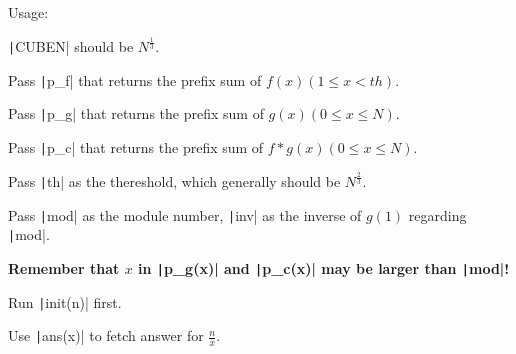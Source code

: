 Usage:
\begin{compactenum}
	\item \texttt|CUBEN| should be $N^{\frac{1}{3}}$.
	\item Pass \texttt|p_f| that returns the prefix sum of $f(x)(1\le x<th)$.
	\item Pass \texttt|p_g| that returns the prefix sum of $g(x)(0\le x\le N)$.
	\item Pass \texttt|p_c| that returns the prefix sum of $f*g(x)(0\le x\le N)$.
	\item Pass \texttt|th| as the thereshold, which generally should be $N^{\frac{2}{3}}$.
	\item Pass \texttt|mod| as the module number, \texttt|inv| as the inverse of $g(1)$ regarding \texttt|mod|.
	\item \textbf{Remember that $x$ in \texttt|p_g(x)| and \texttt|p_c(x)| may be larger than \texttt|mod|!}
	\item Run \texttt|init(n)| first.
	\item Use \texttt|ans(x)| to fetch answer for $\frac{n}{x}$.
\end{compactenum}

\inputminted{cpp}{src/mathematics/computation/dirichlet-convolution.cpp.com}
